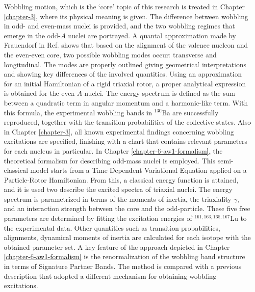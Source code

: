 Wobbling motion, which is the `core' topic of this research is treated in Chapter \ref{chapter-3}, where its physical meaning is given. The difference between wobbling in odd- and even-mass nuclei is provided, and the two wobbling regimes that emerge in the odd-$A$ nuclei are portrayed. A quantal approximation made by Frauendorf in Ref. \cite{frauendorf2014transverse} shows that based on the alignment of the valence nucleon and the even-even core, two possible wobbling modes occur: transverse and longitudinal. The modes are properly outlined giving geometrical interpretations and showing key differences of the involved quantities. Using an approximation for an initial Hamiltonian of a rigid triaxial rotor, a proper analytical expression is obtained for the even-$A$ nuclei. The energy spectrum is defined as the sum between a quadratic term in angular momentum and a harmonic-like term. With this formula, the experimental wobbling bands in $^{130}$Ba are successfully reproduced, together with the transition probabilities of the collective states. Also in Chapter \ref{chapter-3}, all known experimental findings concerning wobbling excitations are specified, finishing with a chart that contains relevant parameters for each nucleus in particular. In Chapter \ref{chapter-6-aw1-formalism}, the theoretical formalism for describing odd-mass nuclei is employed. This semi-classical model starts from a Time-Dependent Variational Equation applied on a Particle-Rotor Hamiltonian. From this, a classical energy function is attained, and it is used two describe the excited spectra of triaxial nuclei. The energy spectrum is parametrized in terms of the moments of inertia, the triaxiality $\gamma$, and an interaction strength between the core and the odd-particle. These five free parameters are determined by fitting the excitation energies of $^{161,163,165,167}$Lu to the experimental data. Other quantities such as transition probabilities, alignments, dynamical moments of inertia are calculated for each isotope with the obtained parameter set. A key feature of the approach depicted in Chapter \ref{chapter-6-aw1-formalism} is the renormalization of the wobbling band structure in terms of Signature Partner Bands. The method is compared with a previous description that adopted a different mechanism for obtaining wobbling excitations.

